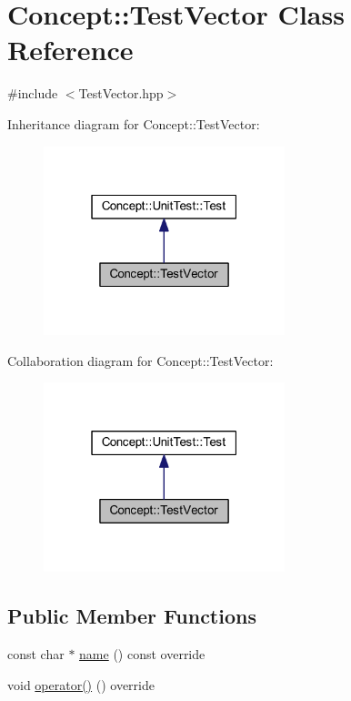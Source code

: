 \hypertarget{class_concept_1_1_test_vector}{}\section{Concept\+::Test\+Vector Class Reference}
\label{class_concept_1_1_test_vector}


{\ttfamily \#include $<$Test\+Vector.\+hpp$>$}



Inheritance diagram for Concept\+::Test\+Vector\+:\nopagebreak
\begin{figure}[H]
\begin{center}
\leavevmode
\includegraphics[width=199pt]{class_concept_1_1_test_vector__inherit__graph}
\end{center}
\end{figure}


Collaboration diagram for Concept\+::Test\+Vector\+:\nopagebreak
\begin{figure}[H]
\begin{center}
\leavevmode
\includegraphics[width=199pt]{class_concept_1_1_test_vector__coll__graph}
\end{center}
\end{figure}
\subsection*{Public Member Functions}
\begin{DoxyCompactItemize}
\item 
const char $\ast$ \mbox{\hyperlink{class_concept_1_1_test_vector_a4ac7a2e867dc34adb9ed55c38046838b}{name}} () const override
\item 
void \mbox{\hyperlink{class_concept_1_1_test_vector_ac53c3efce4e5a4adad27e65d5486313d}{operator()}} () override
\end{DoxyCompactItemize}
